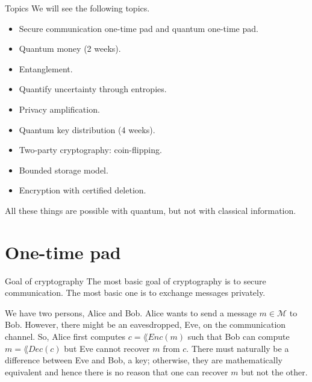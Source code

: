 \documentclass[a4paper]{article}
\begin{document}
\begin{parag}{Topics}
    We will see the following topics.
    \begin{itemize}
        \item Secure communication one-time pad and quantum one-time pad.
        \item Quantum money (2 weeks).
        \item Entanglement.
        \item Quantify uncertainty through entropies.
        \item Privacy amplification.
        \item Quantum key distribution (4 weeks).
        \item Two-party cryptography: coin-flipping.
        \item Bounded storage model.
        \item Encryption with certified deletion.
    \end{itemize}

    All these things are possible with quantum, but not with classical information.

\end{parag}

\section{One-time pad}

\begin{parag}{Goal of cryptography}
    The most basic goal of cryptography is to secure communication. The most basic one is to exchange messages privately.

    We have two persons, Alice and Bob. Alice wants to send a message $m \in \mathcal{M}$ to Bob. However, there might be an eavesdropped, Eve, on the communication channel. So, Alice first computes $c = \lang{Enc}\left(m\right)$ such that Bob can compute $m = \lang{Dec}\left(c\right)$ but Eve cannot recover $m$ from $c$. There must naturally be a difference between Eve and Bob, a key; otherwise, they are mathematically equivalent and hence there is no reason that one can recover $m$ but not the other.
\end{parag}
\end{document}
